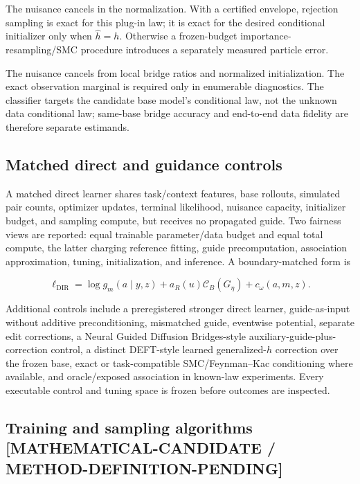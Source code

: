 \documentclass[11pt]{article}
\newcommand{\status}[1]{%
  \textcolor{statusred}{\textbf{\texttt{[#1]}}}%
}
\def\status#1{[#1]}%
\begin{document}
The nuisance cancels in the normalization. With a certified envelope, rejection sampling is exact for this plug-in law; it is exact for the desired conditional initializer only when \(\widehat h=h\). Otherwise a frozen-budget importance-resampling/\allowbreak{}SMC procedure introduces a separately measured particle error.

The nuisance cancels from local bridge ratios and normalized initialization. The exact observation marginal is required only in enumerable diagnostics. The classifier targets the candidate base model's conditional law, not the unknown data conditional law; same-base bridge accuracy and end-to-end data fidelity are therefore separate estimands.

\subsection{Matched direct and guidance controls}
\label{sec:matched-direct-and-guidance-controls}

A matched direct learner shares task/\allowbreak{}context features, base rollouts, simulated pair counts, optimizer updates, terminal likelihood, nuisance capacity, initializer budget, and sampling compute, but receives no propagated guide. Two fairness views are reported: equal trainable parameter/\allowbreak{}data budget and equal total compute, the latter charging reference fitting, guide precomputation, association approximation, tuning, initialization, and inference. A boundary-matched form is

\[
\ell_{\mathrm{DIR}}
=\log g_m(a\mid y,z)
+a_R(u)\mathcal C_B(G_\eta)
+c_\omega(a,m,z).
\]

Additional controls include a preregistered stronger direct learner, guide-as-input without additive preconditioning, mismatched guide, eventwise potential, separate edit corrections, a Neural Guided Diffusion Bridges-style auxiliary-guide-plus-correction control, a distinct DEFT-style learned generalized-\(h\) correction over the frozen base, exact or task-compatible SMC/\allowbreak{}Feynman--Kac conditioning where available, and oracle/\allowbreak{}exposed association in known-law experiments. Every executable control and tuning space is frozen before outcomes are inspected.

\subsection[Training and sampling algorithms]{Training and sampling algorithms\\[-0.15em]{\protect\small\status{MATHEMATICAL-CANDIDATE /\allowbreak{} METHOD-DEFINITION-PENDING}}}
\label{sec:training-and-sampling-algorithms-mathematical-candidate-method-d}
\end{document}
